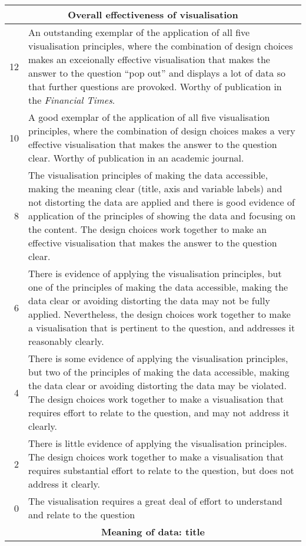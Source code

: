 \documentclass{article}
\begin{document}
\begin{tabular}{@{}|r|p{6.5in}|@{}}
  \multicolumn{2}{c}{\textbf{Overall effectiveness of visualisation}} 
  \\
  \hline
  12 
  &An outstanding exemplar of the application of all five visualisation principles, where the combination of design choices makes an exceionally effective visualisation that makes the answer to the question ``pop out'' and displays a lot of data so that further questions are provoked. Worthy of publication in the \emph{Financial Times}.
  \\
  \hline10 
  &A good exemplar of the application of all five visualisation principles, where the combination of design choices makes a very effective visualisation that makes the answer to the question clear. Worthy of publication in an academic journal.
  \\
  \hline
  8 
  &The visualisation principles of making the data accessible, making
  the meaning clear (title, axis and variable labels) and not distorting
  the data are applied and there is good evidence of application of the
  principles of showing the data and focusing on the content. The design choices work together to make an effective visualisation that makes the answer to the question clear.
  \\
  \hline6 
  &There is evidence of applying the visualisation principles, but one of the principles of making the data accessible, making the data clear or avoiding distorting the data may not be fully applied.  Nevertheless, the design choices work together to make a visualisation that is pertinent to the question, and addresses it reasonably clearly.
  \\
  \hline4 
  &There is some evidence of applying the visualisation principles, but two of the principles of making the data accessible, making the data clear or avoiding distorting the data may be violated. The design choices work together to make a visualisation that requires effort to relate to the question, and may not address it clearly.
  \\
  \hline2 
  &There is little evidence of applying the visualisation principles. The design choices work together to make a visualisation that requires substantial effort to relate to the question, but does not address it clearly.
  \\
  \hline0 
  &The visualisation requires a great deal of effort to understand and
  relate to the question
  \\
  \hline
  \multicolumn{2}{c}{\textbf{Meaning of data: title}}\\

\end{tabular}
\end{document}
